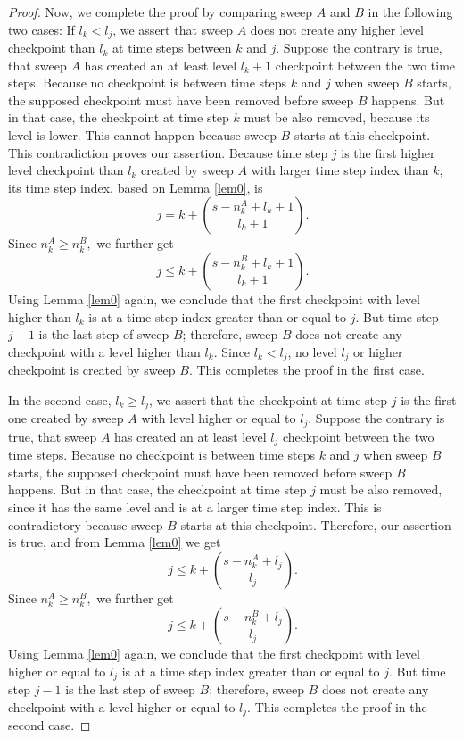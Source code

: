 \documentclass[oneeqnum, onethmnum, onefignum, onetabnum]{siamltex}
\begin{document}
\begin{proof}
    Now, we complete the proof by comparing sweep $A$ and $B$ in the
    following two
    cases: If $l_k < l_j$, we assert that sweep $A$ does not create any
    higher level checkpoint than $l_k$ at time steps between $k$ and $j$.
    Suppose the contrary is true, that sweep $A$ has created an at
    least level $l_k + 1$ checkpoint between the two time steps.  Because no
    checkpoint is between time steps $k$ and $j$ when sweep $B$ starts,
    the supposed checkpoint must have been removed before sweep $B$ happens.
    But in that case, the checkpoint at time step $k$ must be also removed,
    because its level is lower.  This cannot happen because sweep $B$ starts
    at this checkpoint.  This contradiction proves our assertion.
    Because time step $j$ is the first higher level checkpoint than $l_k$
    created by sweep $A$ with larger time step index than $k$, its time step
    index, based on Lemma \ref{lem0}, is
    $$j = k + \binom{s - n_k^{A} + l_k + 1}{l_k + 1}.$$
    Since $ n_k^{A} \ge n_k^{B}, $ we further get
    $$j \le k + \binom{s - n_k^{B} + l_k + 1}{l_k + 1}.$$
    Using Lemma \ref{lem0} again, we conclude that the first checkpoint with
    level higher than $l_k$ is at a time step index greater than or equal to
    $j$.
    But time step $j - 1$ is the last step of sweep $B$; therefore, sweep $B$
    does not create any checkpoint with a level higher than $l_k$.  Since
    $l_k < l_j$,
    no level $l_j$ or higher checkpoint is created by sweep $B$.  This
    completes the proof in the first case.

    In the second case, $l_k \ge l_j$, we assert that the checkpoint at time
    step $j$ is the first one created by sweep $A$ with level higher or equal to
    $l_j$.  Suppose the contrary is true, that sweep $A$ has created an at
    least level $l_j$ checkpoint between the two time steps.  Because no
    checkpoint is between time steps $k$ and $j$ when sweep $B$ starts,
    the supposed checkpoint must have been removed before sweep $B$ happens.
    But in that case, the checkpoint at time step $j$ must be also removed,
    since it has the same level and is at a larger time step index.
    This is contradictory because sweep $B$ starts at this checkpoint.
    Therefore, our assertion is true, and from Lemma \ref{lem0} we get
    $$j \le k + \binom{s - n_k^{A} + l_j}{l_j}.$$
    Since $ n_k^{A} \ge n_k^{B}, $ we further get
    $$j \le k + \binom{s - n_k^{B} + l_j}{l_j}.$$
    Using Lemma \ref{lem0} again, we conclude that the first checkpoint with
    level higher or equal to $l_j$ is at a time step index greater than or
    equal to $j$.
    But time step $j - 1$ is the last step of sweep $B$; therefore, sweep
    $B$ does not create any checkpoint with a level higher or equal to $l_j$.
    This completes the proof in the second case.
\end{proof}
\end{document}
